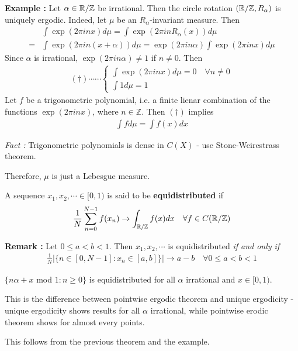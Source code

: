 \documentclass[12pt,a4paper]{report}
\newenvironment{proof}
{\begin{changemargin}{1cm}{0.5cm} 
	}%
	{\end{changemargin}
}
\newenvironment{subproof}
{\begin{changemargin}{0.5cm}{0.5cm}
	}%
	{\end{changemargin}
}
\begin{document}
\textbf{Example :} Let $\alpha \in \mathbb{R} / \mathbb{Z}$ be irrational. Then the circle rotation $(\mathbb{R}/\mathbb{Z},R_{\alpha})$ is uniquely ergodic. Indeed, let $\mu$ be an $R_{\alpha}$-invariant measure. Then
\begin{align*}
& \int \exp (2\pi i n x) d\mu = \int \exp(2\pi i n R_{\alpha}(x)) d\mu \\
=& \int \exp (2\pi i n (x+\alpha)) d\mu = \exp (2\pi i n \alpha) \int \exp (2\pi i n x) d\mu
\end{align*}
Since $\alpha$ is irrational, $\exp(2\pi i n \alpha) \neq 1$ if $n\neq 0$. Then
\begin{align*}
(\dagger)\cdots\cdots \begin{cases}
\int \exp(2\pi i nx)d\mu = 0 \quad \forall n \neq 0 \\
\int 1 d\mu =1
\end{cases}
\end{align*}
Let $f$ be a trigonometric polynomial, i.e. a finite lienar combination of the functions $\exp(2\pi i nx)$, where $n\in \mathbb{Z}$. Then $(\dagger)$ implies
\begin{align*}
\int f d\mu = \int f(x) dx
\end{align*}
\begin{subproof}
\emph{Fact :} Trigonometric polynomials is dense in $C(X)$ - use Stone-Weirestrass theorem.
\end{subproof}
Therefore, $\mu$ is just a Lebesgue measure.
\s

 A sequence $x_1,x_2, \cdots \in [0,1)$ is said to be \textbf{equidistributed} if
\begin{align*}
\frac{1}{N} \sum_{n=0}^{N-1} f(x_n) \rightarrow \int_{\mathbb{R}/\mathbb{Z}} f(x) dx \quad \forall f \in C(\mathbb{R}/\mathbb{Z})
\end{align*}
\s

\textbf{Remark : } Let $0\leq a< b<1$. Then $x_1,x_2,\cdots$ is equidistributed \emph{if and only if}
\begin{align*}
\frac{1}{N} \Big| \{n\in [0,N-1] : x_n \in [a,b] \} \Big| \rightarrow a-b \quad \forall 0\leq a< b<1
\end{align*}
\s

\cor $\{n\alpha + x$ mod $1 : n\geq 0\}$ is equidistributed for all $\alpha$ irrational and $x\in [0,1)$.
\s

This is the difference between pointwise ergodic theorem and unique ergodicity - unique ergodicity shows results for all $\alpha$ irrational, while pointwise erodic theorem shows for almost every points.
\begin{proof}
\pf This follows from the previous theorem and the example.
\end{proof}
\end{document}
